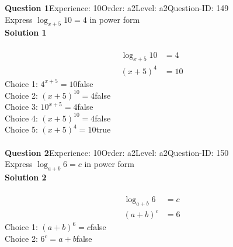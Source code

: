 \documentclass{article}
\begin{document}
\noindent\textbf{Question 1}\hspace{20pt}Experience: 10\hspace{20pt}Order: a2\hspace{20pt}Level: a2\hspace{20pt}Question-ID: 149\\[2pt]
Express $\log_{x+5}10=4$ in power form\\[4pt]
\noindent\textbf{Solution 1}\\[2pt]
\\[-35pt]\begin{align*}
\log_{x+5}10&=4\\[2pt]
(x+5)^4&=10
\end{align*}
Choice 1: \hspace{20pt}$4^{x+5}=10$\hspace{20pt}false\\
Choice 2: \hspace{20pt}$(x+5)^{10}=4$\hspace{20pt}false\\
Choice 3: \hspace{20pt}$10^{x+5}=4$\hspace{20pt}false\\
Choice 4: \hspace{20pt}$(x+5)^{10}=4$\hspace{20pt}false\\
Choice 5: \hspace{20pt}$(x+5)^4=10$\hspace{20pt}true\\
\\[4pt]
\noindent\textbf{Question 2}\hspace{20pt}Experience: 10\hspace{20pt}Order: a2\hspace{20pt}Level: a2\hspace{20pt}Question-ID: 150\\[2pt]
Express $\log_{a+b}6=c$ in power form\\[4pt]
\noindent\textbf{Solution 2}\\[2pt]
\\[-35pt]\begin{align*}
\log_{a+b}6&=c\\[2pt]
(a+b)^c&=6
\end{align*}
Choice 1: \hspace{20pt}$(a+b)^6=c$\hspace{20pt}false\\
Choice 2: \hspace{20pt}$6^c=a+b$\hspace{20pt}false\\
\end{document}
